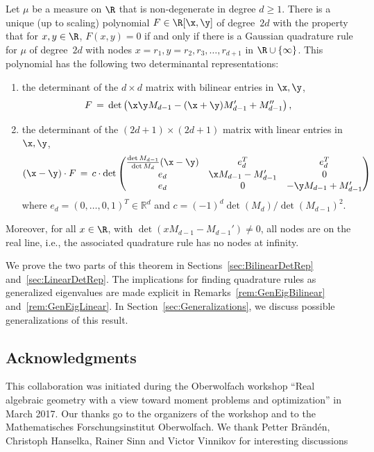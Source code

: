 \begin{theo}\label{thm:main}
Let $\mu$ be a measure on $\R$ that is non-degenerate in degree $d\geq1$. There is a unique (up to scaling) polynomial $F\in \R[\x,\y]$ of degree~$2d$ with the property that for $x,y\in \R$, $F(x,y)=0$ if and only if there is a Gaussian quadrature rule for $\mu$ of degree~$2d$ with nodes $x=r_1,y=r_2,r_3, \hdots, r_{d+1} $ in $ \R\cup \{\infty\}$. This polynomial has the following two determinantal representations:
\begin{enumerate}\alphenumi
\item \label{list1.4.1}the determinant of the $d\times d$ matrix with bilinear entries in $\x,\y$,
\[
F \, = \, \det\left(\x\y M_{d-1} - (\x+\y)M'_{d-1} + M''_{d-1}\right),
\]
\item \label{list1.4.2}the determinant of the $(2d+1)\times (2d+1)$ matrix with linear entries in $\x,\y$,
\[
(\x-\y) \cdot F \, = \, c\cdot \det
\begin{pmatrix}
\frac{\det M_{d-1}}{\det M_d} (\x-\y) &e_d^T&e_d^T\\
e_d&\x M_{d-1}-M_{d-1}'&0\\
e_d&0&-\y M_{d-1}+M_{d-1}'
\end{pmatrix}
\]
where $e_d=(0,\ldots,0,1)^T\in\mathbb{R}^d$ and $c=(-1)^d \det(M_d)/\det(M_{d-1})^2$.
\end{enumerate}
Moreover, for all $x\in \R$, with $\det(x M_{d-1} -M_{d-1}')\neq 0$, all nodes are on the real line, i.e., the associated quadrature rule has no nodes at infinity.
\end{theo}

We prove the two parts of this theorem in Sections~\ref{sec:BilinearDetRep} and~\ref{sec:LinearDetRep}. The implications for finding quadrature rules as generalized eigenvalues are made explicit in Remarks~\ref{rem:GenEigBilinear} and~\ref{rem:GenEigLinear}. In Section~\ref{sec:Generalizations}, we discuss possible generalizations of this result.

\subsection*{Acknowledgments}
This collaboration was initiated during the Oberwolfach workshop ``Real algebraic geometry with a view toward moment problems and optimization'' in March 2017. Our thanks go to the organizers of the workshop and to the Mathematisches Forschungsinstitut Oberwolfach. We thank Petter Br\"andén, Christoph Hanselka, Rainer Sinn and Victor Vinnikov for interesting discussions


